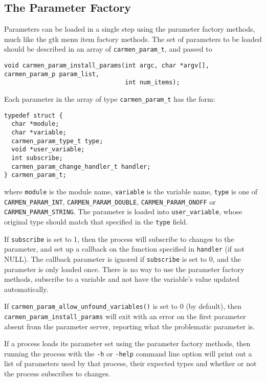 \documentclass{article}
\begin{document}
\subsection{The Parameter Factory}

Parameters can be loaded in a single step using the parameter factory methods,
much like the gtk menu item factory methods. The set of parameters to be
loaded should be described in an array of \verb!carmen_param_t!, and passed to
\begin{verbatim}
void carmen_param_install_params(int argc, char *argv[], carmen_param_p param_list, 
                                 int num_items);
\end{verbatim}

Each parameter in the array of type \verb!carmen_param_t! has the form:
\begin{verbatim}
typedef struct {
  char *module;
  char *variable;
  carmen_param_type_t type;
  void *user_variable;
  int subscribe;
  carmen_param_change_handler_t handler;
} carmen_param_t;
\end{verbatim}
where \verb!module! is the module name, \verb!variable! is the variable name,
\verb!type! is one of \verb!CARMEN_PARAM_INT!, \verb!CARMEN_PARAM_DOUBLE!,
\verb!CARMEN_PARAM_ONOFF! or \verb!CARMEN_PARAM_STRING!. The parameter is
loaded into \verb!user_variable!, whose original type should match that
specified in the \verb!type! field.

If \verb!subscribe! is set to 1, then the process will subscribe to changes to
the parameter, and set up a callback on the function specified in
\verb!handler! (if not NULL). The callback parameter is ignored if
\verb!subscribe! is set to 0, and the parameter is only loaded once. There is
no way to use the parameter factory methods, subscribe to a variable and not
have the variable's value updated automatically. 

If \verb!carmen_param_allow_unfound_variables()! is set to 0 (by default),
then \verb!carmen_param_install_params! will exit with an error on the first
parameter absent from the parameter server, reporting what the problematic
parameter is.

If a process loads its parameter set using the parameter factory methods, then
running the process with the \verb!-h! or \verb!-help! command line option
will print out a list of parameters used by that process, their expected types
and whether or not the process subscribes to changes.
\end{document}
